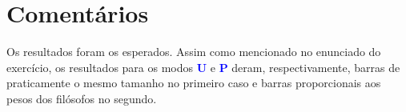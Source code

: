 \documentclass[11pt]{article}
\begin{document}
\section{Comentários}

Os resultados foram os esperados. Assim como mencionado no enunciado do exercício, os resultados para os modos \textbf{\textcolor{blue}{U}} e \textbf{\textcolor{blue}{P}} deram, respectivamente, barras de praticamente o mesmo tamanho no primeiro caso e barras proporcionais aos pesos dos filósofos no segundo. 
\end{document}
